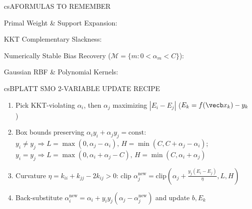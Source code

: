 \documentclass[../../../../master.tex]{subfiles}
\begin{document}

\csnextpage

\begin{cscolumns}
\begin{cscard}{csA}{FORMULAS TO REMEMBER}
  \begin{csbul}
    \item Primal Weight \& Support Expansion:
    \item KKT Complementary Slackness:
    \item Numerically Stable Bias Recovery ($\mathcal M=\{m:0<\alpha_m<C\}$):
    \item Gaussian RBF \& Polynomial Kernels:
  \end{csbul}
\end{cscard}

\begin{cscard}{csB}{PLATT SMO 2-VARIABLE UPDATE RECIPE}
  \begin{enumerate}[leftmargin=1.2em, itemsep=1pt, topsep=1pt, parsep=0pt]
    \item Pick KKT-violating $\alpha_i$, then $\alpha_j$ maximizing $|E_i-E_j|$ ($E_k=f(\vecb x_k)-y_k$)
    \item Box bounds preserving $\alpha_iy_i+\alpha_jy_j=\mathrm{const}$:
      $y_i\ne y_j\Rightarrow L=\max(0,\alpha_j-\alpha_i),\,H=\min(C,C+\alpha_j-\alpha_i)$;
      $y_i=y_j\Rightarrow L=\max(0,\alpha_i+\alpha_j-C),\,H=\min(C,\alpha_i+\alpha_j)$
    \item Curvature $\eta=k_{ii}+k_{jj}-2k_{ij}>0$: clip $\alpha_j^{\mathrm{new}}=\mathrm{clip}(\alpha_j+\frac{y_j(E_i-E_j)}{\eta},L,H)$
    \item Back-substitute $\alpha_i^{\mathrm{new}}=\alpha_i+y_iy_j(\alpha_j-\alpha_j^{\mathrm{new}})$ and update $b, E_k$
  \end{enumerate}
\end{cscard}
\columnbreak


\end{cscolumns}
\end{document}
